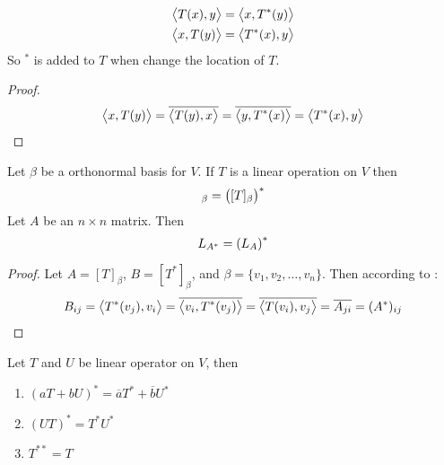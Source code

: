 \begin{theorem}
    \begin{equation}
        \begin{aligned}
            \innerproduct{T(x)}{y} &= \innerproduct{x}{T^*(y)} \\
            \innerproduct{x}{T(y)} &= \innerproduct{T^*(x)}{y}
        \end{aligned}        
    \end{equation}
    So $^*$ is added to $T$ when change the location of $T$.
\end{theorem}
\begin{proof}
    \begin{equation*}
        \innerproduct{x}{T(y)} = \overline{\innerproduct{T(y)}{x}} = \overline{\innerproduct{y}{T^*(x)}} = \innerproduct{T^*(x)}{y}
    \end{equation*}
\end{proof}

\begin{theorem}
    Let $\beta$ be a orthonormal basis for $V$. If $T$ is a linear operation on $V$ then
    \begin{equation}
        [T^*]_\beta = \mleft([T]_\beta \mright)^*
    \end{equation}
    Let $A$ be an $n \times n$ matrix. Then
    \begin{equation}
        L_{A^*} = \mleft(L_A \mright)^*
    \end{equation}
\end{theorem}
\begin{proof}
    Let $A=[T]_\beta$, $B=[T^*]_\beta$, and $\beta=\{v_1, v_2, \dots, v_n \}$. Then according to :
    \begin{equation*}
        B_{ij} = \innerproduct{T^*(v_j)}{v_i} = \overline{\innerproduct{v_i}{T^*(v_j)}} = \overline{\innerproduct{T(v_i)}{v_j}} = \overline{A_{ji}} = (A^*)_{ij}
    \end{equation*}
\end{proof}

\begin{theorem}
    Let $T$ and $U$ be linear operator on $V$, then
    \begin{enumerate}
        \item $(aT+bU)^* = \overline{a} T^* + \overline{b} U^*$
        \item $(UT)^* = T^* U^*$
        \item $T^{**} = T$
    \end{enumerate}    
\end{theorem}


